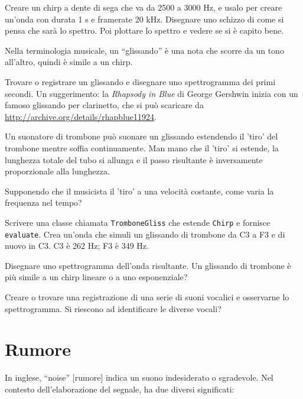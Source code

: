 \documentclass[12pt,a4paper]{book}
\begin{document}
\begin{exercise} Creare un chirp a dente di sega che va da 2500 a 3000 Hz, e usalo per creare un'onda con durata 1 s e framerate 20 kHz. Disegnare uno schizzo di come si pensa che sarà lo spettro. Poi plottare lo spettro e vedere se si è capito bene. \end{exercise} 

\begin{exercise} Nella terminologia musicale, un ``glissando'' è una nota che scorre da un tono all'altro, quindi è simile a un chirp.

Trovare o registrare un glissando e disegnare uno spettrogramma dei primi secondi. Un suggerimento: la {\it Rhapsody in Blue} di George Gershwin inizia con un famoso glissando per clarinetto, che si può scaricare da \url{http://archive.org/details/rhapblue11924}. \end{exercise} 

\begin{exercise} Un suonatore di trombone può suonare un glissando estendendo il 'tiro' del trombone mentre soffia continuamente. Man mano che il 'tiro' si estende, la lunghezza totale del tubo si allunga e il passo risultante è inversamente proporzionale alla lunghezza.

Supponendo che il musicista il 'tiro' a una velocità costante, come varia la frequenza nel tempo?

Scrivere una classe chiamata {\tt TromboneGliss} che estende {\tt Chirp} e fornisce {\tt evaluate}. Crea un'onda che simuli un glissando di trombone da C3 a F3 e di nuovo in C3. C3 è 262 Hz; F3 è 349 Hz.

Disegnare uno spettrogramma dell'onda risultante. Un glissando di trombone è più simile a un chirp lineare o a uno esponenziale? \end{exercise} 

\begin{exercise} Creare o trovare una registrazione di una serie di suoni vocalici e osservarne lo spettrogramma. Si riescono ad identificare le diverse vocali? \end{exercise} 

\chapter{Rumore} 

In inglese, ``noise'' [rumore] indica un suono indesiderato o sgradevole. Nel contesto dell'elaborazione del segnale, ha due diversi significati:
\end{document}
